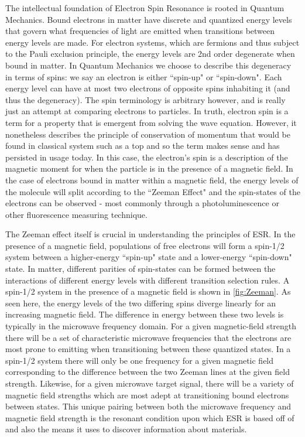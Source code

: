 \documentclass[oneside, astronomy, noacknowlegments]{BYUPhys}
\begin{document}
The intellectual foundation of Electron Spin Resonance is rooted in Quantum Mechanics. Bound electrons in matter have discrete and quantized energy levels that govern what frequencies of light are emitted when transitions between energy levels are made. For electron systems, which are fermions and thus subject to the Pauli exclusion principle, the energy levels are 2nd order degenerate when bound in matter. In Quantum Mechanics we choose to describe this degeneracy in terms of spins: we say an electron is either ``spin-up" or ``spin-down". Each energy level can have at most two electrons of opposite spins inhabiting it (and thus the degeneracy). The spin terminology is arbitrary however, and is really just an attempt at comparing electrons to particles. In truth, electron spin is a term for a property that is emergent from solving the wave equation. However, it nonetheless describes the principle of conservation of momentum that would be found in classical system such as a top and so the term makes sense and has persisted in usage today. In this case, the electron's spin is a description of the magnetic moment for when the particle is in the presence of a magnetic field. In the case of electrons bound in matter within a magnetic field, the energy levels of the molecule will split according to the ``Zeeman Effect" and the spin-states of the electrons can be observed - most commonly through a photoluminescence or other fluorescence measuring technique.

The Zeeman effect itself is crucial in understanding the principles of ESR. In the presence of a magnetic field, populations of free electrons will form a spin-1/2 system between a higher-energy ``spin-up" state and a lower-energy ``spin-down" state. In matter, different parities of spin-states can be formed between the interactions of different energy levels with different transition selection rules. A spin-1/2 system in the presence of a magnetic field is shown in \ref{fig:Zeeman}. As seen here, the energy levels of the two differing spins diverge linearly for an increasing magnetic field. The difference in energy between these two levels is typically in the microwave frequency domain. For a given magnetic-field strength there will be a set of characteristic microwave frequencies that the electrons are most prone to emitting when transitioning between these quantized states. In a spin-1/2 system there will only be one frequency for a given magnetic field corresponding to the difference between the two Zeeman lines at the given field strength. Likewise, for a given microwave target signal, there will be a variety of magnetic field strengths which are most adept at transitioning bound electrons between states. This unique pairing between both the microwave frequency and magnetic field strength is the resonant condition upon which ESR is based off of and also the means it uses to discover information about materials.
\end{document}

